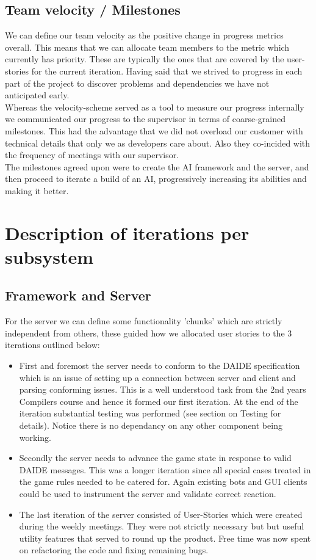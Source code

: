 \documentclass[pdftex,12pt,a4paper]{report}
\begin{document}
\subsection{Team velocity / Milestones}
We can define our team velocity as the positive change in progress
metrics overall.  This means that we can allocate team members to the
metric which currently has priority. These are typically the ones that
are covered by the user-stories for the current iteration. Having said
that we strived to progress in each part of the project to discover
problems and dependencies we have not anticipated early.  \\ Whereas
the velocity-scheme served as a tool to measure our progress
internally we communicated our progress to the supervisor in terms of
coarse-grained milestones. This had the advantage that we did not
overload our customer with technical details that only we as
developers care about. Also they co-incided with the frequency of
meetings with our supervisor.  \\ The milestones agreed upon were to
create the AI framework and the server, and then proceed to iterate a
build of an AI, progressively increasing its abilities and making it
better.

\section{Description of iterations per subsystem}

\subsection{Framework and Server}

For the server we can define some functionality 'chunks' which are
strictly independent from others, these guided how we allocated user
stories to the 3 iterations outlined below:

\begin{itemize}
\item First and foremost the server needs to conform to the DAIDE
  specification which is an issue of setting up a connection between
  server and client and parsing conforming issues. This is a well
  understood task from the 2nd years Compilers course and hence it
  formed our first iteration. At the end of the iteration substantial
  testing was performed (see section on Testing for details). Notice
  there is no dependancy on any other component being working.
\item Secondly the server needs to advance the game state in response
  to valid DAIDE messages. This was a longer iteration since all
  special cases treated in the game rules needed to be catered
  for. Again existing bots and GUI clients could be used to instrument
  the server and validate correct reaction.
\item The last iteration of the server consisted of User-Stories which
  were created during the weekly meetings. They were not strictly
  necessary but but useful utility features that served to round up
  the product. Free time was now spent on refactoring the code and
  fixing remaining bugs.
\end{itemize}
\end{document}
